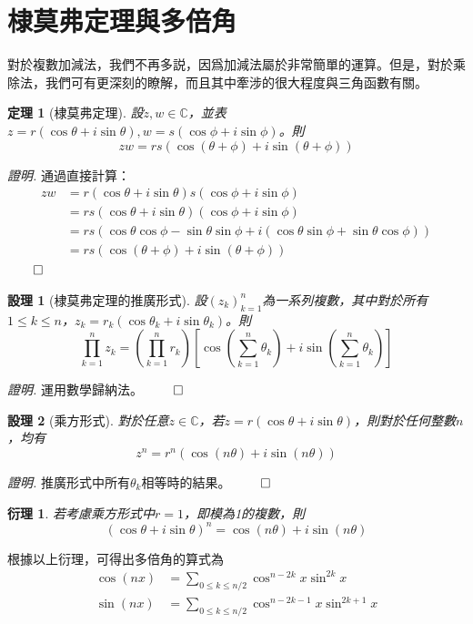 \documentclass[12pt]{article}
\newtheorem*{theorem}{定理}
\newtheorem*{corollary}{衍理}
\newtheorem*{proposition}{設理}
\renewenvironment*{proof}{\textit{證明.}}{\hfill$\qed$}
\begin{document}
    \section*{棣莫弗定理與多倍角}

    對於複數加減法，我們不再多説，因爲加減法屬於非常簡單的運算。但是，對於乘除法，我們可有更深刻的瞭解，而且其中牽涉的很大程度與三角函數有關。

    \begin{theorem}[棣莫弗定理]
        設$z,w\in\mathbb{C}$，並表$z=r(\cos{\theta}+i\sin{\theta}),w=s(\cos{\phi}+i\sin{\phi})$。則$$zw=rs(\cos(\theta+\phi)+i\sin(\theta+\phi))$$
    \end{theorem}

    \begin{proof}
        通過直接計算：\begin{align*}
            zw&=r(\cos{\theta}+i\sin{\theta})s(\cos{\phi}+i\sin{\phi})\\
            &=rs(\cos{\theta}+i\sin{\theta})(\cos{\phi}+i\sin{\phi})\\
            &=rs(\cos{\theta}\cos{\phi}-\sin{\theta}\sin{\phi}+i(\cos{\theta}\sin{\phi}+\sin{\theta}\cos{\phi}))\\
            &=rs(\cos(\theta+\phi)+i\sin(\theta+\phi))
        \end{align*}
    \end{proof}

    \begin{proposition}[棣莫弗定理的推廣形式]
        設$(z_k)_{k=1}^n$為一系列複數，其中對於所有$1\leq k\leq n$，$z_k=r_k(\cos{\theta_k}+i\sin{\theta_k})$。則$$\prod_{k=1}^{n}z_k=(\prod_{k=1}^{n}r_k)[\cos(\sum_{k=1}^{n}\theta_k)+i\sin(\sum_{k=1}^{n}\theta_k)]$$
    \end{proposition}

    \begin{proof}
        運用數學歸納法。
    \end{proof}

    \begin{proposition}[乘方形式]
        對於任意$z\in\mathbb{C}$，若$z=r(\cos{\theta}+i\sin{\theta})$，則對於任何整數$n$，均有$$z^n=r^n(\cos(n\theta)+i\sin(n\theta))$$
    \end{proposition}

    \begin{proof}
        推廣形式中所有$\theta_k$相等時的結果。
    \end{proof}

    \begin{corollary}
        若考慮乘方形式中$r=1$，即模為1的複數，則$$(\cos{\theta}+i\sin{\theta})^n=\cos(n\theta)+i\sin(n\theta)$$
    \end{corollary}

    根據以上衍理，可得出多倍角的算式為\begin{align*}
        \cos(nx)&=\sum_{0\leq k\leq n/2}\cos^{n-2k}{x}\sin^{2k}{x}\\
        \sin(nx)&=\sum_{0\leq k\leq n/2}\cos^{n-2k-1}{x}\sin^{2k+1}{x}\\
    \end{align*}
\end{document}
